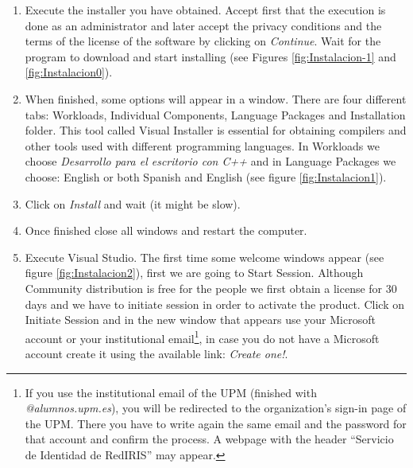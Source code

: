 \begin{enumerate}
    
    \item Execute the installer you have obtained. Accept first that the execution is done as an administrator and later accept the privacy conditions and the terms of the license of the software by clicking on \textit{Continue}. Wait for the program to download and start installing (see Figures \ref{fig:Instalacion-1} and \ref{fig:Instalacion0}).
    
    \item When finished, some options will appear in a window. There are four different tabs: Workloads, Individual Components, Language Packages and Installation folder. This tool called Visual Installer is essential for obtaining compilers and other tools used with different programming languages. In Workloads we choose \textit{Desarrollo para el escritorio con C++} and in Language Packages we choose: English or both Spanish and English (see figure \ref{fig:Instalacion1}).
    
    \item Click on \textit{Install} and wait (it might be slow).
    
    \item Once finished close all windows and restart the computer.
    
    \item Execute Visual Studio. The first time some welcome windows appear (see figure \ref{fig:Instalacion2}), first we are going to Start Session. Although Community distribution is free for the people we first obtain a license for 30 days and we have to initiate session in order to activate the product. Click on Initiate Session and in the new window that appears use your Microsoft account or your institutional email\footnote{If you use the institutional email of the UPM (finished with \textit{@alumnos.upm.es}), you will be redirected to the organization's sign-in page of the UPM. There you have to write again the same email and the password for that account and confirm the process. A webpage with the header ``Servicio de Identidad de RedIRIS'' may appear.}, in case you do not have a Microsoft account create it using the available link: \textit{Create one!}.
    

\end{enumerate}
